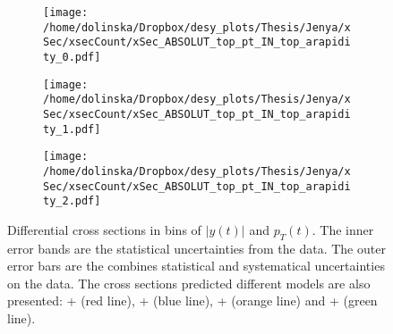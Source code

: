 \begin{figure}[p]
\centering
\begin{subfigure}
  \centering
  \texttt{[image: /home/dolinska/Dropbox/desy\_plots/Thesis/Jenya/xSec/xsecCount/xSec\_ABSOLUT\_top\_pt\_IN\_top\_arapidity\_0.pdf]}
\end{subfigure}
\begin{subfigure}
  \centering
  \texttt{[image: /home/dolinska/Dropbox/desy\_plots/Thesis/Jenya/xSec/xsecCount/xSec\_ABSOLUT\_top\_pt\_IN\_top\_arapidity\_1.pdf]}
\end{subfigure}
\begin{subfigure}
  \centering
  \texttt{[image: /home/dolinska/Dropbox/desy\_plots/Thesis/Jenya/xSec/xsecCount/xSec\_ABSOLUT\_top\_pt\_IN\_top\_arapidity\_2.pdf]}
\end{subfigure}
\caption{Differential cross sections in bins of $|y(t)|$ and $p_{T}(t)$. The inner error bands are the statistical uncertainties from the data.
         The outer error bars are the combines statistical and systematical uncertainties on the data. The cross sections predicted different models are also presented:
         \MG + \PYTHIA (red line), \Powheg + \PYTHIA (blue line), \Powheg + \HERWIG (orange line) and \MCNLO + \HERWIG (green line).}
\label{fig:XSU_2D_y_pt}
\end{figure}

